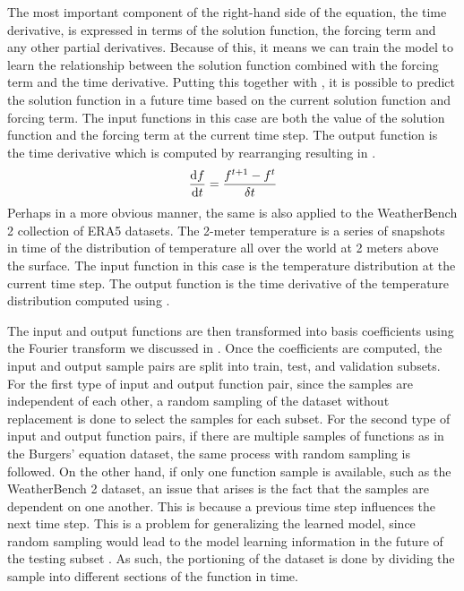 The most important component of the right-hand side of the equation, the time derivative, is expressed in terms of the solution function, the forcing term and any other partial derivatives. Because of this, it means we can train the model to learn the relationship between the solution function combined with the forcing term and the time derivative. Putting this together with , it is possible to predict the solution function in a future time based on the current solution function and forcing term. The input functions in this case are both the value of the solution function and the forcing term at the current time step. The output function is the time derivative which is computed by rearranging  resulting in .
\begin{equation}
  \dv{f}{t} = \frac{f^{t+1} - f^{t}}{\delta t} \label{eq:time_derivative_time_step_function}
\end{equation}
Perhaps in a more obvious manner, the same is also applied to the WeatherBench 2 collection of ERA5 datasets. The 2-meter temperature is a series of snapshots in time of the distribution of temperature all over the world at 2 meters above the surface. The input function in this case is the temperature distribution at the current time step. The output function is the time derivative of the temperature distribution computed using .

The input and output functions are then transformed into basis coefficients using the Fourier transform we discussed in . Once the coefficients are computed, the input and output sample pairs are split into train, test, and validation subsets. For the first type of input and output function pair, since the samples are independent of each other, a random sampling of the dataset without replacement is done to select the samples for each subset. For the second type of input and output function pairs, if there are multiple samples of functions as in the Burgers' equation dataset, the same process with random sampling is followed. On the other hand, if only one function sample is available, such as the WeatherBench 2 dataset, an issue that arises is the fact that the samples are dependent on one another. This is because a previous time step influences the next time step. This is a problem for generalizing the learned model, since random sampling would lead to the model learning information in the future of the testing subset \autocite{kapoorLeakageReproducibilityCrisis2023,kaufmanLeakageDataMining2012}. As such, the portioning of the dataset is done by dividing the sample into different sections of the function in time.

